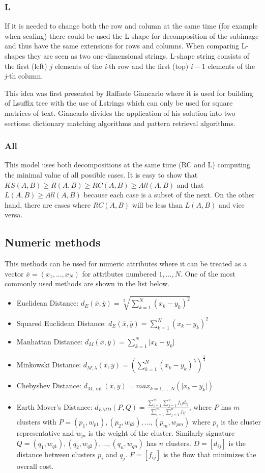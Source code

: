 \subsubsection{L}
If it is needed to change both the row and column at the same time (for example when scaling) there could be used the L-shape for decomposition of the subimage and thus have the same extensions for rows and columns. When comparing L-shapes they are seen as two one-dimensional strings. L-shape string consists of the first (left) $j$ elements of the \textit{i}-th row and the first (top) $i-1$ elements of the \textit{j}-th column.

This idea was first presented by Raffaele Giancarlo \cite{lshape} where it is used for building of Lsuffix tree with the use of Lstrings which can only be used for square matrices of text. Giancarlo divides the application of his solution into two sections: dictionary matching algorithms and pattern retrieval algorithms.

\subsubsection{All}
This model uses both decompositions at the same time (RC and L) computing the minimal value of all possible cases. It
is easy to show that $KS(A,B) \geq R(A,B) \geq RC(A,B) \geq All(A,B)$ and that $L(A,B) \geq All(A,B) $ because each case is a subset of the next. On the other hand, there are cases where $RC(A,B)$ will be less than $L(A,B)$ and vice versa. 

\subsection{Numeric methods}
This methods can be used for numeric attributes where it can be treated as a vector $\bar{x}=(x_1,...,x_N)$ for attributes numbered $1,...,N$. One of the most commonly used methods are shown in the list below.
\begin{itemize}
\item Euclidean Distance: $d_E (\bar{x},\bar{y})=\sqrt[2]{\sum_{k=1}^N (x_k-y_k)^2} $
\item Squared Euclidean Distance: $d_E (\bar{x},\bar{y})=\sum_{k=1}^N (x_k-y_k)^2 $
\item Manhattan Distance: $d_M (\bar{x},\bar{y})=\sum_{k=1}^N 
{\lvert x_k-y_k \rvert}$
\item Minkowski Distance: $d_{M,\lambda} (\bar{x},\bar{y})=(\sum_{k=1}^N (x_k-y_k)^\lambda)^{\frac{1}{\lambda}} $
\item Chebyshev Distance: $d_{M,\inf} (\bar{x},\bar{y})=max_{k=1,...,N}(\lvert x_k-y_k \rvert) $
\item Earth Mover's Distance: $d_{EMD}(P,Q)=\frac{\sum_{i=1}^m\sum_{j=1}^n f_{ij}d_{ij}}{\sum_{i=1}^m\sum_{j=1}^n f_{ij}}$, where $P$ has $m$ clusters with $P={(p_1, w_{p1}), (p_2, w_{p2}),...,(p_m, w_{pm})}$ where $p_i$ is the cluster representative and $w_{pi}$ is the weight of the cluster. Similarly signature $Q={(q_1, w_{q1}), (q_2, w_{q2}),...,(q_n, w_{qn})}$ has $n$ clusters. $D=[d_{ij}]$ is the distance between clusters $p_i$ and $q_j$. $F=[f_{ij}]$ is the flow that minimizes the overall cost.
\end{itemize}

